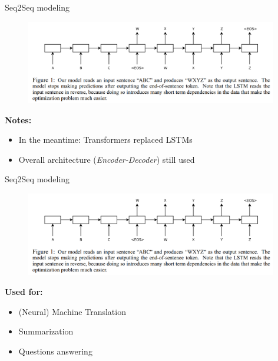 
\begin{vbframe}{Seq2Seq modeling}

\vspace{1cm}

	\begin{figure}
		\centering
		\includegraphics[width = 11cm]{figure/seq2seq.png}\\ 
	\end{figure}

\textbf{Notes:}

\begin{itemize}
	\item In the meantime: Transformers replaced LSTMs
	\item Overall architecture (\textit{Encoder-Decoder}) still used
\end{itemize}

\vfill

\end{vbframe}


\begin{vbframe}{Seq2Seq modeling}

\vspace{1cm}

	\begin{figure}
		\centering
		\includegraphics[width = 11cm]{figure/seq2seq.png}\\ 
	\end{figure}

\textbf{Used for:}

\begin{itemize}
	\item (Neural) Machine Translation
	\item Summarization
	\item Questions answering
\end{itemize}

\vfill

\end{vbframe}

